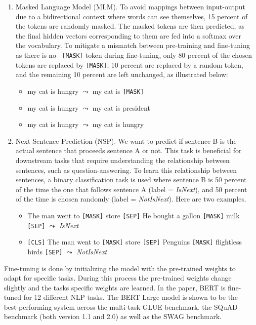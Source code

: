 \documentclass[11pt, a4paper]{amsart}
\begin{document}
\begin{enumerate}
	\item Masked Language Model (MLM). 
	To avoid mappings between input-output due to a bidirectional context where words can see themselves, 15 percent of the tokens are randomly masked. 
	The masked tokens are then predicted, as the final hidden vectors corresponding to them are fed into a softmax over the vocabulary. 
	To mitigate a mismatch between pre-training and fine-tuning as there is no \texttt{ \texttt{[MASK]}} token during fine-tuning, only 80 percent of the chosen tokens are replaced by \texttt{[MASK]}; 10 percent are replaced by a random token, and the remaining 10 percent are left unchanged, as illustrated below:
	\begin{itemize}
		\item my cat is hungry $\leadsto$ my cat is \texttt{[MASK]}
		\item my cat is hungry $\leadsto$ my cat is president
		\item my cat is hungry $\leadsto$ my cat is hungry
	\end{itemize}
	
	\item Next-Sentence-Prediction (NSP).
	We want to predict if sentence B is the actual sentence that proceeds sentence A or not. 
	This task is beneficial for downstream tasks that require understanding the relationship between sentences, such as question-answering.
	To learn this relationship between sentences, a binary classification task is used where sentence B is 50 percent of the time the one that follows sentence A (label = \textit{IsNext}), and 50 percent of the time is chosen randomly (label = \textit{NotIsNext}). 
	Here are two examples.
	\begin{itemize}
		\item The man went to \texttt{[MASK]} store \texttt{[SEP]} He bought a gallon \texttt{[MASK]} milk \texttt{[SEP]} $\leadsto$ \textit{IsNext}
		\item \texttt{[CLS]} The man went to  \texttt{[MASK]} store \texttt{[SEP]} Penguins \texttt{[MASK]} flightless birds \texttt{[SEP]} $\leadsto$ \textit{NotIsNext}
	\end{itemize}
\end{enumerate}

Fine-tuning is done by initializing the model with the pre-trained weights to adapt for specific tasks. 
During this process the pre-trained weights change slightly and the tasks specific weights are learned.
In the paper, BERT is fine-tuned for 12 different NLP tasks.
The BERT Large model is shown to be the best-performing system across the multi-task GLUE benchmark, the SQuAD benchmark (both version 1.1 and 2.0) as well as the SWAG benchmark.
\end{document}
